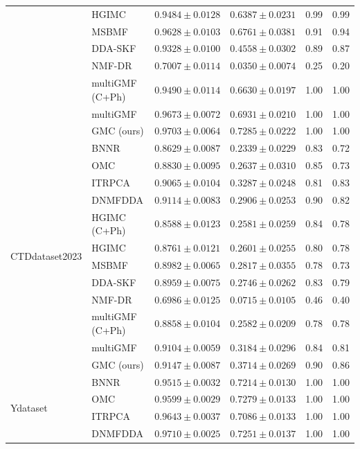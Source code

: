 \documentclass[webpdf,modern,large]{oup-authoring-template}
\begin{document}
\begin{table}[tb]
\begin{tabular}{llcccc}
& HGIMC & $0.9484 \pm 0.0128$ & $0.6387 \pm 0.0231$ & 0.99 & 0.99 \\
& MSBMF & $0.9628 \pm 0.0103$ & $0.6761 \pm 0.0381$ & 0.91 & 0.94 \\
& DDA-SKF & $0.9328 \pm 0.0100$ & $0.4558 \pm 0.0302$ & 0.89 & 0.87 \\
& NMF-DR & $0.7007 \pm 0.0114$ & $0.0350 \pm 0.0074$ & 0.25 & 0.20 \\
& multiGMF (C+Ph) & $0.9490 \pm 0.0114$ & $0.6630 \pm 0.0197$ & 1.00 & 1.00 \\
& multiGMF & $0.9673 \pm 0.0072$ & $0.6931 \pm 0.0210$ & 1.00 & 1.00 \\
& GMC (ours) & $0.9703 \pm 0.0064$ & \textbf{$0.7285 \pm 0.0222$} & 1.00 & 1.00 \\
\midrule
\multirow{12}{*}{CTDdataset2023}
& BNNR & $0.8629 \pm 0.0087$ & $0.2339 \pm 0.0229$ & 0.83 & 0.72 \\
& OMC & $0.8830 \pm 0.0095$ & $0.2637 \pm 0.0310$ & 0.85 & 0.73 \\
& ITRPCA & $0.9065 \pm 0.0104$ & $0.3287 \pm 0.0248$ & 0.81 & 0.83 \\
& DNMFDDA & $0.9114 \pm 0.0083$ & $0.2906 \pm 0.0253$ & 0.90 & 0.82 \\
& HGIMC (C+Ph) & $0.8588 \pm 0.0123$ & $0.2581 \pm 0.0259$ & 0.84 & 0.78 \\
& HGIMC & $0.8761 \pm 0.0121$ & $0.2601 \pm 0.0255$ & 0.80 & 0.78 \\
& MSBMF & $0.8982 \pm 0.0065$ & $0.2817 \pm 0.0355$ & 0.78 & 0.73 \\
& DDA-SKF & $0.8959 \pm 0.0075$ & $0.2746 \pm 0.0262$ & 0.83 & 0.79 \\
& NMF-DR & $0.6986 \pm 0.0125$ & $0.0715 \pm 0.0105$ & 0.46 & 0.40 \\
& multiGMF (C+Ph) & $0.8858 \pm 0.0104$ & $0.2582 \pm 0.0209$ & 0.78 & 0.78 \\
& multiGMF & $0.9104 \pm 0.0059$ & $0.3184 \pm 0.0296$ & 0.84 & 0.81 \\
& GMC (ours) & $0.9147 \pm 0.0087$ & \textbf{$0.3714 \pm 0.0269$} & 0.90 & 0.86 \\
\midrule
\multirow{12}{*}{Ydataset}
& BNNR & $0.9515 \pm 0.0032$ & $0.7214 \pm 0.0130$ & 1.00 & 1.00 \\
& OMC & $0.9599 \pm 0.0029$ & $0.7279 \pm 0.0133$ & 1.00 & 1.00 \\
& ITRPCA & $0.9643 \pm 0.0037$ & $0.7086 \pm 0.0133$ & 1.00 & 1.00 \\
& DNMFDDA & $0.9710 \pm 0.0025$ & $0.7251 \pm 0.0137$ & 1.00 & 1.00 \\

\end{tabular}
\end{table}
\end{document}

